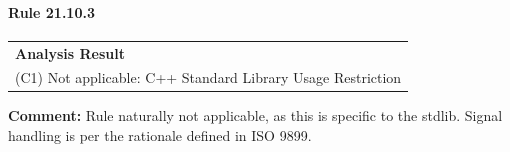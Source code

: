 \paragraph{Rule 21.10.3}
\begin{longtable}{p{13cm}}
\textbf{Analysis Result} \\
(C1) Not applicable: C++ Standard Library Usage Restriction \\
\end{longtable}
\textbf{Comment:} Rule naturally not applicable, as this is specific to the \Cpp stdlib. Signal handling is per the rationale defined in ISO 9899. \\
